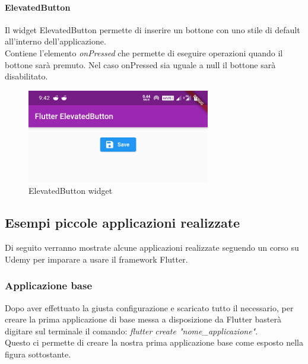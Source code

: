\paragraph{ElevatedButton}
Il widget ElevatedButton permette di inserire un bottone con uno stile di default all'interno dell'applicazione.\\
Contiene l'elemento \textit{onPressed} che permette di eseguire operazioni quando il bottone sarà premuto. Nel caso onPressed sia uguale a null il bottone sarà disabilitato.
\begin{figure}[htbp]	
	\centering
	\includegraphics[width=8cm]{immagini/button.png}
	\caption{ElevatedButton widget}
	\label{fig:ElevatedButton widget}
\end{figure}

\newpage

\subsection{Esempi piccole applicazioni realizzate}
Di seguito verranno mostrate alcune applicazioni realizzate seguendo un corso su Udemy \cite{corso} per imparare a usare il framework Flutter.

\subsubsection{Applicazione base}
Dopo aver effettuato la giusta configurazione e scaricato tutto il necessario, per creare la prima applicazione di base messa a disposizione da Flutter basterà digitare sul terminale il comando: \textit{flutter create "nome\_applicazione"}.\\
Questo ci permette di creare la nostra prima applicazione base come esposto nella figura sottostante.\\

